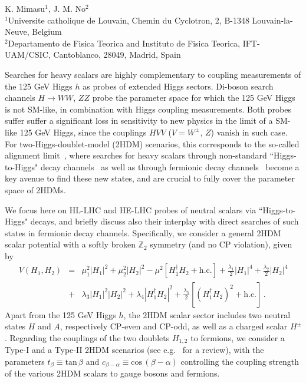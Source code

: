 
\begin{center}
 {K. Mimasu$^{1}$, J. M. No$^{2}$ \\
}
 {\small $^{1}$Universite catholique de Louvain, Chemin du Cyclotron, 2, B-1348 Louvain-la-Neuve, Belgium \\
 $^{2}$Departamento de Fisica Teorica and Instituto de Fisica Teorica, IFT-UAM/CSIC, Cantoblanco, 28049, Madrid, Spain}
\end{center}

\vspace{2mm}

Searches for heavy scalars are highly complementary to coupling measurements of the 125 GeV Higgs $h$ as probes of extended Higgs sectors. 
Di-boson search channels $H \to WW$, $ZZ$ probe the parameter space for which the 125 GeV Higgs is not SM-like, 
in combination with Higgs coupling measurements. Both probes suffer suffer a significant loss in  
sensitivity to new physics in the limit of a SM-like 125 GeV Higgs, 
since the couplings $HVV$ ($V = W^{\pm},\,Z$) vanish in such case.
For two-Higgs-doublet-model (2HDM) scenarios, this corresponds to the so-called alignment limit~\cite{Gunion:2002zf},
where searches for heavy scalars through non-standard ``Higgs-to-Higgs"
decay channels~\cite{Coleppa:2014hxa,Dorsch:2014qja,Li:2015lra,Kling:2016opi,Dorsch:2016tab} 
as well as through fermionic decay channels~\cite{Craig:2015jba,Gori:2016zto} become a key avenue to find these new states, 
and are crucial to fully cover the parameter space of 2HDMs.

We focus here on HL-LHC and HE-LHC probes of neutral scalars via ``Higgs-to-Higgs" decays, and briefly discuss also their interplay 
with direct searches of such states in fermionic decay channels. Specifically, we consider a general 2HDM scalar potential with a softly broken 
$\mathbb{Z}_2$ symmetry (and no CP violation), given by 
%
\begin{eqnarray}	
\label{2HDM_potential}
V(H_1,H_2) &= &\mu^2_1 \left|H_1\right|^2 + \mu^2_2\left|H_2\right|^2 - \mu^2\left[H_1^{\dagger}H_2+\mathrm{h.c.}\right] 
+\frac{\lambda_1}{2}\left|H_1\right|^4 +\frac{\lambda_2}{2}\left|H_2\right|^4 \nonumber \\
&+& \lambda_3 \left|H_1\right|^2\left|H_2\right|^2
+\lambda_4 \left|H_1^{\dagger}H_2\right|^2+ \frac{\lambda_5}{2}\left[\left(H_1^{\dagger}H_2\right)^2+\mathrm{h.c.}\right]\, . 
\end{eqnarray}
%
Apart from the 125 GeV Higgs $h$, the 2HDM scalar sector includes two neutral states 
$H$ and $A$, respectively CP-even and CP-odd, as well as a charged scalar $H^{\pm}$.
Regarding the couplings of the two doublets $H_{1,2}$ to fermions, we consider  
a Type-I and a Type-II 2HDM scenarios (see e.g.~\cite{} for a review),
with the parameters $t_{\beta} \equiv \mathrm{tan}\,\beta$ and $c_{\beta -\alpha} \equiv \mathrm{cos}\,(\beta-\alpha)$ controlling 
the coupling strength of the various 2HDM scalars to gauge bosons and fermions.
% 

